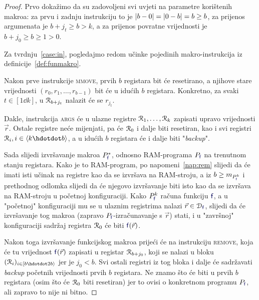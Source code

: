 \begin{proof}
Prvo dokažimo da su zadovoljeni svi uvjeti na parametre korištenih makroa: za prvu i zadnju instrukciju to je $\lvert b-0\rvert=\lvert0-b\rvert=b\ge b$, za prijenos argumenata je $b+j_t\ge b>k$, a za prijenos povratne vrijednosti je $b+j_0\ge b\ge 1>0$.

Za tvrdnju~\ref{case:in}, pogledajmo redom učinke pojedinih makro-instrukcija iz definicije~\ref{def:funmakro}.

	Nakon prve instrukcije \textsc{mmove}, prvih $b$ registara bit će resetirano, a njihove stare vrijednosti $(r_0,r_1,\dots,r_{b-1})$ bit će u idućih $b$ registara. Konkretno, za svaki $t\in[1\dd k]$, u $\mathcal R_{b+j_t}$ nalazit će se $r_{j_t}$.

Dakle, instrukcija \textsc{args} će u ulazne registre $\mathcal R_{1},\dots,\mathcal R_{k}$ zapisati upravo vrijednosti $\vec r$. Ostale registre neće mijenjati, pa će $\mathcal R_{0}$ i dalje biti resetiran, kao i svi registri $\reg{i},i\in\langle k\dd b\rangle$, a u idućih $b$ registara će i dalje biti "\!\emph{backup}".

Sada slijedi izvršavanje makroa $P_{\f{f}}^*$, odnosno RAM-programa $P_{\f{f}}$ na trenutnom stanju registara. Kako je to RAM-program, po napomeni~\ref{nap:rem} slijedi da će imati isti učinak na registre kao da se izvršava na RAM-stroju, a iz $b\ge m_{P_{\f{f}}^k}$ i prethodnog odlomka slijedi da će njegovo izvršavanje biti isto kao da se izvršava na  RAM-stroju u početnoj konfiguraciji. Kako $P_{\f{f}}^k$ računa funkciju $\f{f}$, a u "početnoj" konfiguraciji mu se u ulaznim registrima nalazi $\vec r\in\dom{\f{f}}$, slijedi da će izvršavanje tog makroa  (zapravo $P_{\f{f}}$-izračunavanje s $\vec r$) stati, i u "završnoj" konfiguraciji sadržaj registra $\mathcal R_{0}$ će biti $\f{f}(\vec r)$.

Nakon toga izvršavanje funkcijskog makroa prijeći će na instrukciju \textsc{remove}, koja će tu vrijednost $\f{f}(\vec r)$ zapisati u registar $\mathcal R_{b+j_0}$, koji se nalazi u bloku $(\reg{i})_{i\in[b\dd 2b\rangle}$ jer je $j_0<b$. Svi ostali registri iz tog bloka i dalje će sadržavati \emph{backup} početnih vrijednosti prvih $b$ registara. Ne znamo što će biti u prvih $b$ registara (osim što će $\mathcal R_{0}$ biti resetiran) jer to ovisi o konkretnom programu $P_{\f{f}}$, ali zapravo to nije ni bitno.


\end{proof}
